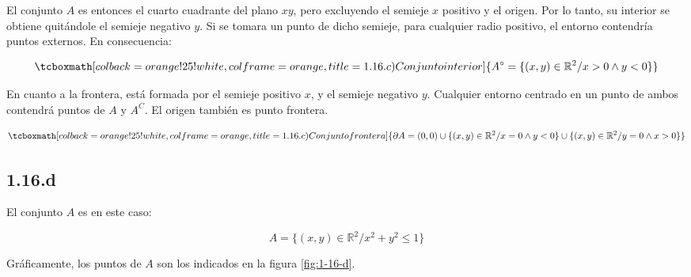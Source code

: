 \documentclass{article}
\renewcommand{\Bbb}{\mathbb}
\begin{document}
El conjunto $A$ es entonces el cuarto cuadrante del plano $xy$, pero excluyendo el semieje $x$ positivo y el origen. Por lo tanto, su interior se obtiene quitándole el semieje negativo $y$. Si se tomara un punto de dicho semieje, para cualquier radio positivo, el entorno contendría puntos externos. En consecuencia:

\begin{equation}
\tcboxmath[colback=orange!25!white,colframe=orange, title=1.16.c) Conjunto interior]
{ A^{\circ} = \{ (x, y) \in \Bbb R^2 / x > 0 \wedge y < 0 \}  }
\end{equation}

En cuanto a la frontera, está formada por el semieje positivo $x$, y el semieje negativo $y$. Cualquier entorno centrado en un punto de ambos contendrá puntos de $A$ y $A^C$. El origen también es punto frontera.

\begin{equation}
\tcboxmath[colback=orange!25!white,colframe=orange, title=1.16.c) Conjunto frontera]
{ \partial{A} = (0,0) \cup \{ (x, y) \in \Bbb R^2 / x = 0 \wedge y < 0 \} \cup \{ (x, y) \in \Bbb R^2 / y = 0 \wedge x > 0 \} }
\end{equation}

\subsection*{1.16.d}
\label{subsec:1.16.d}

El conjunto $A$ es en este caso:

\begin{equation}
A = \{ (x,y) \in \Bbb R^2 / x^2 + y^2 \leq 1 \}
\end{equation}

Gráficamente, los puntos de $A$ son los indicados en la figura \ref{fig:1-16-d}.
\end{document}
